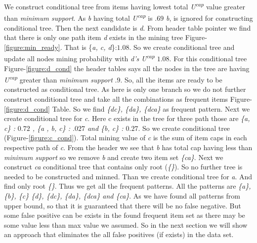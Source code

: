 \documentclass[conference]{IEEEtran}
\begin{document}
    We construct conditional tree from items having lowest total \emph{U\textsuperscript{cap}} value greater than \emph{minimum support}. As \emph{b} having total \emph{U\textsuperscript{cap}} is $.69$ \emph{b}, is ignored for constructing conditional tree. Then the next candidate is \emph{d}. From header table pointer we find that there is only one path item \emph{d} exists in the mining tree Figure-\ref{figure:min_ready}. That is \{\emph{a, c, d}\}:$1.08$. So we create conditional tree and update all nodes mining probability with \emph{d's} \emph{U\textsuperscript{cap}} $1.08$. For this conditional tree Figure-\ref{figure:d_cond} the header tables says all the nodes in the tree are having \emph{U\textsuperscript{cap}} greater than \emph{minimum support} $.9$. So, all the items are ready to be constructed as conditional tree. As here is only one branch so we do not further construct conditional tree and take all the combinations as frequent items Figure-\ref{figure:d_cond} Table. So we find \emph{\{dc\}, \{da\}, \{dca\}} as frequent pattern. Next we create conditional tree for \emph{c}. Here c exists in the tree for three path those are \emph{\{a, c\} : $0.72$ , \{a , b, c\} : $.027$ and \{b, c\} : $0.27$}. So we create conditional tree (Figure-\ref{figure:c_cond}). Total mining value of \emph{c} is the sum of item caps in each respective path of \emph{c}. From the header we see that \emph{b} has total cap having less than \emph{minimum support} so we remove \emph{b} and create two item set \emph{\{ca\}}. Next we construct \emph{ca} conditional tree that contains only root (\emph{\{\}}). So no further tree is needed to be constructed and minned. Than we create conditional tree for \emph{a}. And find only root \emph{\{\}}. Thus we get all the frequent patterns. All the patterns are \emph{\{a\}, \{b\}, \{c\} \{d\}, \{dc\}, \{da\}, \{dca\} and \{ca\}}. As we have found all patterns from upper bound, so that it is guaranteed that there will be no false negative. But some false positive can be exists in the found frequent item set as there may be some value less than max value we assumed. So in the next section we will show an approach that eliminates the all false positives (if exists) in the data set.
    
    
\end{document}
